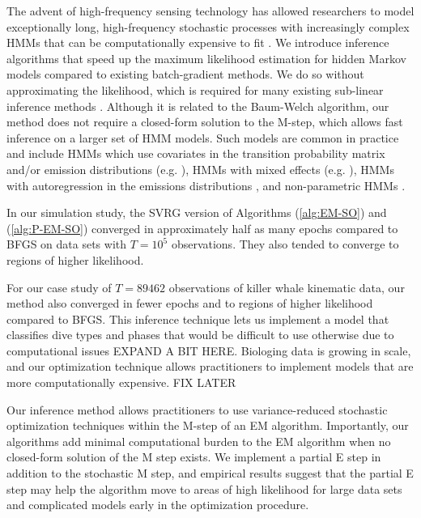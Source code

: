
The advent of high-frequency sensing technology has allowed researchers to model exceptionally long, high-frequency stochastic processes with increasingly complex HMMs that can be computationally expensive to fit \citep{Patterson:2017}.
%
We introduce inference algorithms that speed up the maximum likelihood estimation for hidden Markov models compared to existing batch-gradient methods. We do so without approximating the likelihood, which is required for many existing sub-linear inference methods \citep{Gotoh:1998,Ye:2017}. Although it is related to the Baum-Welch algorithm, our method does not require a closed-form solution to the M-step, which allows fast inference on a larger set of HMM models. Such models are common in practice and include HMMs which use covariates in the transition probability matrix and/or emission distributions (e.g. \citet{Pirotta:2018}), HMMs with mixed effects (e.g. \citet{McClintock:2021}), HMMs with autoregression in the emissions distributions \citep{Lawler:2019}, and non-parametric HMMs \citep{Langrock:2018}. 

In our simulation study, the SVRG version of Algorithms (\ref{alg:EM-SO}) and (\ref{alg:P-EM-SO}) converged in approximately half as many epochs compared to BFGS on data sets with $T=10^{5}$ observations. They also tended to converge to regions of higher likelihood. 

For our case study of $T = 89462$ observations of killer whale kinematic data, our method also converged in fewer epochs and to regions of higher likelihood compared to BFGS. This inference technique lets us implement a model that classifies dive types and phases that would be difficult to use otherwise due to computational issues EXPAND A BIT HERE. Biologing data is growing in scale, and our optimization technique allows practitioners to implement models that are more computationally expensive. FIX LATER

Our inference method allows practitioners to use variance-reduced stochastic optimization techniques within the M-step of an EM algorithm. Importantly, our algorithms add minimal computational burden to the EM algorithm when no closed-form solution of the M step exists. We implement a partial E step in addition to the stochastic M step, and empirical results suggest that the partial E step may help the algorithm move to areas of high likelihood for large data sets and complicated models early in the optimization procedure.

